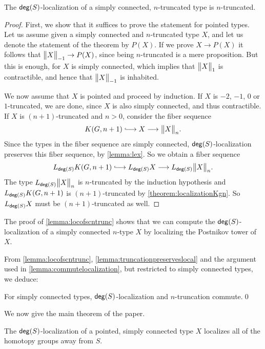 \begin{lem}\label{lemma:locofscntrunc}
    The $\degg(S)$-localization of a simply connected, $n$-truncated type is $n$-truncated.
\end{lem}

\begin{proof}
    First, we show that it suffices to prove the statement for pointed types.
    Let us assume given a simply connected and $n$-truncated type $X$, and let us denote the statement
    of the theorem by $P(X)$. If we prove $X \to P(X)$ it follows that $\ttrunc{-1}{X} \to P(X)$,
    since being $n$-truncated is a mere proposition. But this is enough, for $X$ is
    simply connected, which implies that $\ttrunc{1}{X}$ is contractible, and hence that
    $\ttrunc{-1}{X}$ is inhabited.

    We now assume that $X$ is pointed and proceed by induction.
    If $X$ is $-2$, $-1$, $0$ or $1$-truncated, we are done, since $X$ is also simply connected, and thus contractible.
    If $X$ is $(n+1)$-truncated and $n > 0$, consider the fiber sequence
    \[ K(G,n+1) \longhookrightarrow X \lra \ttrunc{n}{X}. \]
    Since the types in the fiber sequence are simply connected, $\degg(S)$-localization
    preserves this fiber sequence, by \cref{lemma:lex}. So we obtain a fiber sequence
    \[L_{\degg(S)} K(G,n+1) \longhookrightarrow L_{\degg(S)}X \lra L_{\degg(S)} \ttrunc{n}{X}. \]
    The type $L_{\degg(S)} \ttrunc{n}{X}$ is $n$-truncated by the induction hypothesis
    and $L_{\degg(S)} K(G,n+1)$ is $(n+1)$-truncated by \cref{theorem:localizationKgn}.
    So $L_{\degg(S)} X$ must be $(n+1)$-truncated as well.
\end{proof}

The proof of \cref{lemma:locofscntrunc} shows that we can compute
the $\degg(S)$-localization of a simply connected $n$-type $X$ by
localizing the Postnikov tower of $X$.

From \cref{lemma:locofscntrunc}, \cref{lemma:truncationpreserveslocal} and
the argument used in \cref{lemma:commutelocalization}, but restricted to simply connected types,
we deduce:

\begin{cor}\label{corollary:localizationandtruncationcommute}
    For simply connected types, $\degg(S)$-localization and $n$-trunca\-tion commute.\qed
\end{cor}

We now give the main theorem of the paper.

\begin{thm}\label{theorem:localizationlocalizes}
    The $\degg(S)$-localization of a pointed, simply connected type $X$ localizes all of the
    homotopy groups away from $S$.
\end{thm}

